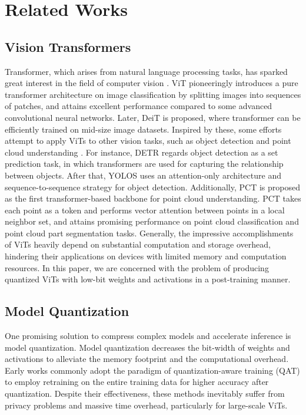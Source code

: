 \section{Related Works}
\subsection{Vision Transformers}
Transformer, which arises from natural language processing tasks, has sparked great interest in the field of computer vision \cite{yan2023learning}. ViT \cite{dosovitskiy2020image} pioneeringly introduces a pure transformer architecture on image classification by splitting images into sequences of patches, and attains excellent performance compared to some advanced convolutional neural networks. Later, DeiT \cite{touvron2021training} is proposed, where transformer can be efficiently trained on mid-size image datasets. Inspired by these, some efforts attempt to apply ViTs to other vision tasks, such as object detection \cite{carion2020end,DBLP:conf/nips/FangLWFQWNL21} and point cloud understanding \cite{guo2021pct,zhao2021point}. For instance, DETR \cite{carion2020end} regards object detection as a set prediction task, in which transformers are used for capturing the relationship between objects. After that, YOLOS \cite{DBLP:conf/nips/FangLWFQWNL21} uses an attention-only architecture and sequence-to-sequence strategy for object detection. Additionally, PCT \cite{guo2021pct} is proposed as the first transformer-based backbone for point cloud understanding. PCT takes each point as a token and performs vector attention between points in a local neighbor set, and attains promising performance on point cloud classification and point cloud part segmentation tasks. Generally, the impressive accomplishments of ViTs heavily depend on substantial computation and storage overhead, hindering their applications on devices with limited memory and computation resources. In this paper, we are concerned with the problem of producing quantized ViTs with low-bit weights and activations in a post-training manner. 

\subsection{Model Quantization}
One promising solution to compress complex models and accelerate inference is model quantization. Model quantization decreases the bit-width of weights and activations to alleviate the memory footprint and the computational overhead. Early works \cite{lin2015neural,nagel2022overcoming} commonly adopt the paradigm of quantization-aware training (QAT) to employ retraining on the entire training data for higher accuracy after quantization. Despite their effectiveness, these methods inevitably suffer from privacy problems and massive time overhead, particularly for large-scale ViTs. 

